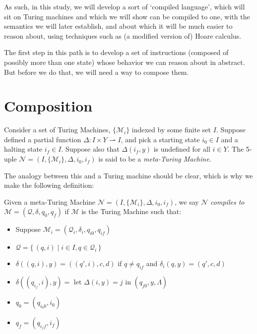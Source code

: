 \documentclass{article}
\newcommand{\M}{\mathcal{M}}
\newcommand{\Nc}{\mathcal{N}}
\newcommand{\Q}{\mathcal{Q}}
\begin{document}
	As such, in this study, we will develop a sort of `compiled language', which will sit on Turing machines and which we will show can be compiled to one, with the semantics we will later establish, and about which it will be much easier to reason about, using techniques such as (a modified version of) Hoare calculus.
	
	The first step in this path is to develop a set of instructions (composed of possibly more than one state) whose behavior we can reason about in abstract. But before we do that, we will need a way to compose them.
	
	\section{Composition}
	
	Consider a set of Turing Machines, $\{\M_i\}$ indexed by some finite set $I$. Suppose defined a partial function $\Delta : I \times Y \rightharpoonup I$, and pick a starting state $i_0 \in I$ and a halting state $i_f \in I$. Suppose also that $\Delta(i_f, y)$ is undefined for all $i \in Y$. The 5-uple $\Nc = (I, \{\M_i\}, \Delta, i_0, i_f)$ is said to be a \emph{meta-Turing Machine}.
	
	The analogy between this and a Turing machine should be clear, which is why we make the following definition:
	
	Given a meta-Turing Machine $\Nc = (I, \{\M_i\}, \Delta, i_0, i_f)$, we say $\Nc$ \emph{compiles to} $\M = (\Q, \delta, q_0, q_f)$ if $\M$ is the Turing Machine such that:
	
	\begin{itemize}
	\item Suppose $\M_i = (\Q_i, \delta_i, q_{i0}, q_{if})$
	
	\item $\Q = \{\,(q, i) \mid i \in I, q \in \Q_i\,\}$
	
	\item $\delta((q, i), y) = ((q', i), c, d)$ if $q \neq q_{if}$ and $\delta_i(q, y) = (q', c, d)$
	
	\item $\delta((q_{i_f}, i), y) = \text{ let $\Delta(i, y) = j$ in } (q_{j0}, y, \Lambda)$
	
	\item $q_0 = (q_{i_0 0}, i_0)$
	
	\item $q_f = (q_{i_f f}, i_f)$
	\end{itemize}
	
\end{document}
